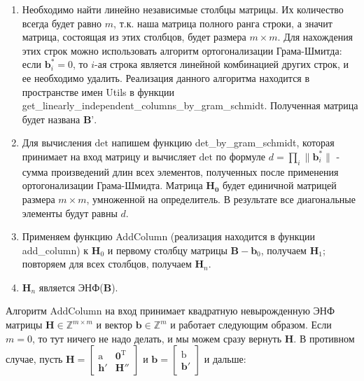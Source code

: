 \begin{enumerate}
\item Необходимо найти линейно независимые столбцы матрицы. Их количество всегда будет равно $ m $, т.к. наша матрица полного ранга строки, а значит матрица, состоящая из этих столбцов, будет размера $ m \times m $. Для нахождения этих строк можно использовать алгоритм ортогонализации Грама-Шмитда: если $ \mathbf{b}_i^\ast=0 $, то $ i $-ая строка является линейной комбинацией других строк, и ее необходимо удалить. Реализация данного алгоритма находится в пространстве имен Utils в функции get\_linearly\_independent\_columns\_by\_gram\_schmidt. Полученная матрица будет названа $  \mathbf{B}’ $.
\item Для вычисления $ \mathrm{det} $ напишем функцию det\_by\_gram\_schmidt, которая принимает на вход матрицу и вычисляет $ \mathrm{det} $ по формуле $ d=\prod_i{\|\mathbf{b}_i^\ast\|} $ - сумма произведений длин всех элементов, полученных после применения ортогонализации Грама-Шмидта. Матрица $ \mathbf{H}_\mathbf{0} $ будет единичной матрицей размера $ m \times m $, умноженной на определитель. В результате все диагональные элементы будут равны $ d $.
\item Применяем функцию AddColumn (реализация находится в функции add\_column) к $ \mathbf{H}_0 $ и первому столбцу матрицы $ \mathbf{B} - \mathbf{b}_0 $, получаем $ \mathbf{H}_1 $; повторяем для всех столбцов, получаем $ \mathbf{H}_n $.
\item $ \mathbf{H}_n $ является ЭНФ($ \mathbf{B} $).
\end{enumerate}

Алгоритм AddColumn на вход принимает квадратную невырожденную ЭНФ матрицы $ \mathbf{H} \in \mathbb{Z}^{m \times m} $ и вектор $ \mathbf{b} \in \mathbb{Z}^m $ и работает следующим образом. Если $ m = 0 $, то тут ничего не надо делать, и мы можем сразу вернуть $ \mathbf{H} $. В противном случае, пусть 
$ \mathbf{H} = \left[ \begin{array}{cccc}
\mathrm{a} & \mathbf{0}^\mathrm{T} \\
\mathbf{h}' & \mathbf{H}'' \end{array} \right] $ и 
$ \mathbf{b} = \left[ \begin{array}{cccc}
\mathrm{b} \\
\mathbf{b}' \end{array} \right] $ и дальше:

